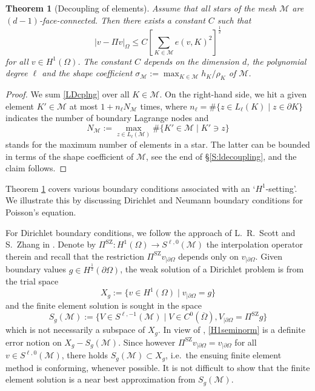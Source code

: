 \documentclass[a4paper]{amsart}
\numberwithin{equation}{section}
\theoremstyle{plain}
\newtheorem{thm}{Theorem}[section]
\theoremstyle{definition}
\begin{document}
\begin{thm}[Decoupling of elements]
\label{T:elm-dec}
Assume that all stars of the mesh ${\mathcal{M}}$ are $(d-1)$-face-connected.  Then 
there exists a constant $C$ such that
\begin{equation*}
 {\left|{v-{\Pi} v}\right|_{{\Omega}}}
 \leq
 C \left[
  \sum_{{K}\in{\mathcal{M}}} e(v,{K})^2
 \right]^{\frac12}
\end{equation*}
for all $v\in{H^{1}}(\Omega)$.  The constant $C$ depends on the dimension $d$, 
the polynomial degree ${\ell}$ and the shape coefficient $\sigma_{\mathcal{M}} {:=} 
\max_{{K}\in{\mathcal{M}}}  h_{K}/\rho_{K}$ of ${\mathcal{M}}$.
\end{thm}

\begin{proof}
We sum \eqref{LDcplng} over all ${K}\in{\mathcal{M}}$.  On the right-hand side, we hit 
a given element ${K}'\in{\mathcal{M}}$ at most $1+n_{\ell} N_{\mathcal{M}}$ times, where 
$n_{\ell} = \#\{z\in{L_{{\ell}}}({K})\mid z\in\partial{K}\}$ indicates the 
number of boundary Lagrange nodes and 
\[
 N_{\mathcal{M}}
 {:=}
 \max_{z\in{L_{{\ell}}}({\mathcal{M}})} \#\{{K}'\in{\mathcal{M}} \mid {K}'\ni z\}
\]
stands for the maximum number of elements in a star. The latter can be bounded 
in terms of the shape coefficient of ${\mathcal{M}}$, see the end 
of \S\ref{S:ldecoupling}, and the claim follows.
\end{proof}

Theorem \ref{T:elm-dec} covers various boundary conditions associated with an 
`${H^{1}}$-setting'.  We illustrate this by discussing Dirichlet
and Neumann boundary conditions for Poisson's equation.

For Dirichlet boundary conditions, we follow the approach of
L.\ R.\ Scott and S.\ Zhang in \cite[\S5]{Scott.Zhang:90}.  Denote by
${\Pi^{\text{SZ}}}:{H^{{1}}}(\Omega)\to{S}^{{\ell},0}({\mathcal{M}})$ the interpolation
operator therein and recall that the restriction ${\Pi^{\text{SZ}}} v_{|\partial\Omega}$
depends only on $v_{|\partial\Omega}$.  Given boundary values
$g\in{H^{{\frac12}}}(\partial\Omega)$, the weak solution of a Dirichlet
problem is from the trial space
\[
 X_g {:=} \{ v \in {H^{1}}(\Omega) \mid v_{|\partial\Omega} = g \}
\]
and the finite element solution is sought in the space
\[
 {S}_g({\mathcal{M}})
 {:=}
 \{ V\in{S}^{{\ell},-1}({\mathcal{M}}) \mid
    V\in C^0(\overline\Omega),
    V_{|\partial\Omega} = {\Pi^{\text{SZ}}} g \}
 
 
\]
which is not necessarily a subspace of $X_g$.  In view of \cite[Lemma 
2.1]{Sacchi.Veeser:06}, \eqref{H1seminorm} is a definite error notion on 
$X_g-{S}_g({\mathcal{M}})$.  Since however ${\Pi^{\text{SZ}}} v_{|\partial\Omega} = 
v_{|\partial\Omega}$ for all $v\in{S}^{{\ell},0}({\mathcal{M}})$, there holds 
${S}_g({\mathcal{M}})\subset X_g$, i.e.\ the ensuing finite element method is 
conforming, whenever possible.  It is not difficult to show that the finite 
element solution is a near best approximation from ${S}_g({\mathcal{M}})$.
\end{document}
